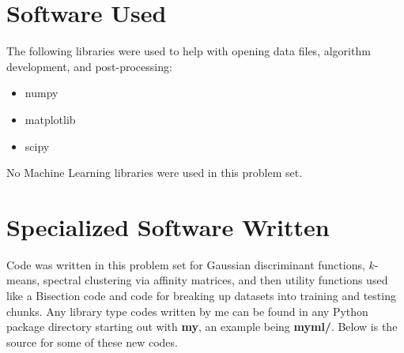 \documentclass{article}[12pt]
\begin{document}
   
   \newpage
   \section{Software Used}
   The following libraries were used to help with opening data files, algorithm development, and post-processing:
   
   \begin{itemize}
   \item numpy
   \item matplotlib
   \item scipy
   \end{itemize}

	No Machine Learning libraries were used in this problem set.
   
   \newpage
   \section{Specialized Software Written}
   Code was written in this problem set for Gaussian discriminant functions, $k$-means, spectral clustering via affinity matrices, and then utility functions used like a Bisection code and code for breaking up datasets into training and testing chunks. Any library type codes written by me can be found in any Python package directory starting out with \textbf{my}, an example being \textbf{myml/}. Below is the source for some of these new codes.
   
\end{document}
